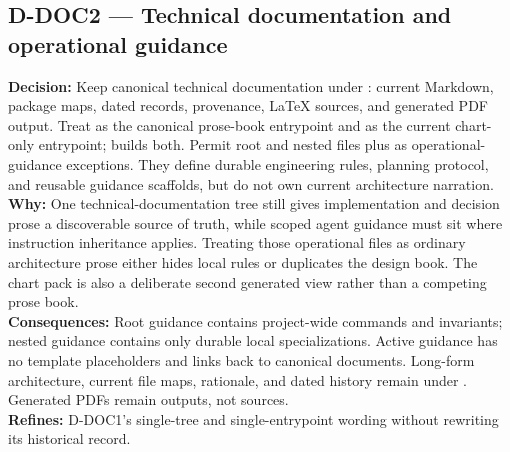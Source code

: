 \subsection*{D-DOC2 --- Technical documentation and operational guidance}
\begin{decisionbox}[title={D-DOC2 \quad 2026-08-09}]
\textbf{Decision:} Keep canonical technical documentation under
: current Markdown, package maps, dated records, provenance,
LaTeX sources, and generated PDF output. Treat  as
the canonical prose-book entrypoint and 
as the current chart-only entrypoint;  builds both.
Permit root and nested  files plus  as
operational-guidance exceptions. They define durable engineering rules,
planning protocol, and reusable guidance scaffolds, but do not own current
architecture narration.\\
\textbf{Why:} One technical-documentation tree still gives implementation and
decision prose a discoverable source of truth, while scoped agent guidance must
sit where instruction inheritance applies. Treating those operational files as
ordinary architecture prose either hides local rules or duplicates the design
book. The chart pack is also a deliberate second generated view rather than a
competing prose book.\\
\textbf{Consequences:} Root guidance contains project-wide commands and
invariants; nested guidance contains only durable local specializations. Active
guidance has no template placeholders and links back to canonical documents.
Long-form architecture, current file maps, rationale, and dated history remain
under . Generated PDFs remain outputs, not sources.\\
\textbf{Refines:} D-DOC1's single-tree and single-entrypoint wording without
rewriting its historical record.
\end{decisionbox}

